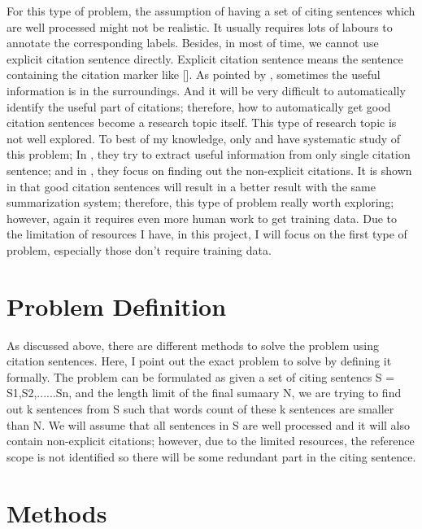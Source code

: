 \documentclass[hyp]{socreport}
\begin{document}
For this type of problem, the assumption of having a set of citing sentences which are well processed might not be realistic. It usually requires lots of labours to annotate the corresponding labels. Besides, in most of time, we cannot use explicit citation sentence directly. Explicit citation sentence means the sentence containing the citation marker like {} []. As pointed by \citep{qazvinian2010}, sometimes the useful information is in the surroundings. And it will be very difficult to automatically identify the useful part of citations; therefore, how to automatically get good citation sentences become a research topic itself. This type of research topic is not well explored. To best of my knowledge, only	\citep{abujbara2012} and	\citep{qazvinianradev:2010} have systematic study of this problem; In \citep{abujbara2012}, they try to extract useful information from only single citation sentence; and in \citep{qazvinianradev:2010}, they focus on finding out the non-explicit citations. It is shown in \citep{abujbara2012} that good citation sentences will result in a better result with the same summarization system; therefore, this type of problem really worth exploring; however, again it requires even more human work to get training data. Due to the limitation of resources I have, in this project, I will focus on the first type of problem, especially those don't require training data.


\section{Problem Definition}

As discussed above, there are different methods to solve the problem using citation sentences. Here, I point out the exact problem to solve by defining it formally. The problem can be formulated as given a set of citing sentencs S = {S1,S2,......Sn}, and the length limit of the final sumaary N, we are trying to find out k sentences from S such that words count of these k sentences are smaller than N. We will assume that all sentences in S are well processed and it will also contain non-explicit citations; however, due to the limited resources, the reference scope is not identified so there will be some redundant part in the citing sentence.



\section{Methods}
\end{document}
